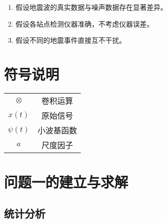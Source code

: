 \documentclass[withoutpreface,bwprint]{cumcmthesis} %
\begin{document}
\begin{enumerate}
	\item 假设地震波的真实数据与噪声数据存在显著差异。
	\item 假设各站点检测仪器准确，不考虑仪器误差。
	\item 假设不同的地震事件直接互不干扰。
\end{enumerate}

\section{符号说明}

\begin{center}
	\begin{tabular}{cc}
		\hline
		\makebox[0.3\textwidth][c]{符号} & \makebox[0.4\textwidth][c]{意义} \\
		\hline
		$\otimes$                      & 卷积运算                           \\
		$x(t)$                         & 原始信号                           \\
		$\psi(t)$                      & 小波基函数                          \\
		$a$                            & 尺度因子                           \\
		\hline
	\end{tabular}
\end{center}

\section{问题一的建立与求解}

\subsection{统计分析}







\end{document}
